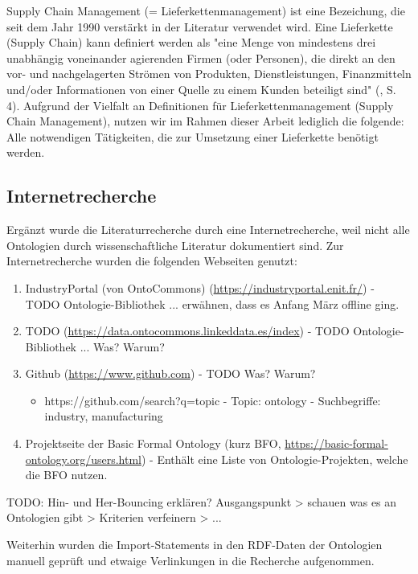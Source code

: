 \documentclass{article}
\begin{document}
Supply Chain Management (= Lieferkettenmanagement) ist eine Bezeichung, die seit dem Jahr 1990 verstärkt in der Literatur verwendet wird. Eine Lieferkette (Supply Chain) kann definiert werden als "eine Menge von mindestens drei unabhängig voneinander agierenden Firmen (oder Personen), die direkt an den vor- und nachgelagerten Strömen von Produkten, Dienstleistungen, Finanzmitteln und/oder Informationen von einer Quelle zu einem Kunden beteiligt sind" (\cite{mentzer2001defining}, S. 4). Aufgrund der Vielfalt an Definitionen für Lieferkettenmanagement (Supply Chain Management), nutzen wir im Rahmen dieser Arbeit lediglich die folgende: Alle notwendigen Tätigkeiten, die zur Umsetzung einer Lieferkette benötigt werden.

\subsection{Internetrecherche}

Ergänzt wurde die Literaturrecherche durch eine Internetrecherche, weil nicht alle Ontologien durch wissenschaftliche Literatur dokumentiert sind.
Zur Internetrecherche wurden die folgenden Webseiten genutzt:

\begin{enumerate}
    \item IndustryPortal (von OntoCommons) (\url{https://industryportal.enit.fr/}) - TODO Ontologie-Bibliothek ... erwähnen, dass es Anfang März offline ging.
    \item TODO (\url{https://data.ontocommons.linkeddata.es/index}) - TODO Ontologie-Bibliothek ... Was? Warum?
    \item Github (\url{https://www.github.com}) - TODO Was? Warum?
       \begin{itemize}
           \item https://github.com/search?q=topic%
           - Topic: ontology
           - Suchbegriffe: industry, manufacturing
       \end{itemize}
    \item Projektseite der Basic Formal Ontology (kurz BFO, \url{https://basic-formal-ontology.org/users.html}) - Enthält eine Liste von Ontologie-Projekten, welche die BFO nutzen.
\end{enumerate}

TODO: Hin- und Her-Bouncing erklären? Ausgangspunkt > schauen was es an Ontologien gibt > Kriterien verfeinern > ...

Weiterhin wurden die Import-Statements in den RDF-Daten der Ontologien manuell geprüft und etwaige Verlinkungen in die Recherche aufgenommen.
\end{document}
